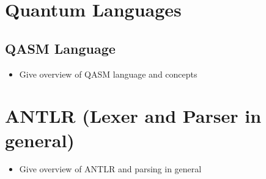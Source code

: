 \section{Quantum Languages}

\subsection{QASM Language}
\begin{itemize}
    \item Give overview of QASM language and concepts
\end{itemize}

\section{ANTLR (Lexer and Parser in general)}
\begin{itemize}
    \item Give overview of ANTLR and parsing in general
\end{itemize}